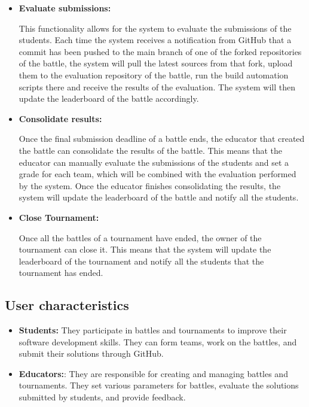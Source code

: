 \documentclass{article}
\begin{document}
\begin{itemize}
    \item \textbf{Evaluate submissions:}
    
    This functionality allows for the system to evaluate the submissions of the students. Each time the system receives
    a notification from GitHub that a commit has been pushed to the main branch of one of the forked repositories of the battle,
    the system will pull the latest sources from that fork, upload them to the evaluation repository of the battle, run the build automation scripts
    there and receive the results of the evaluation. The system will then update the leaderboard of the battle accordingly.

    \item \textbf{Consolidate results:}
    
    Once the final submission deadline of a battle ends, the educator that created the battle can consolidate the 
    results of the battle. This means that the educator can manually evaluate the submissions of the students and 
    set a grade for each team, which will be combined with the evaluation performed by the system. Once the educator
    finishes consolidating the results, the system will update the leaderboard of the battle and notify all the students.

    \item \textbf{Close Tournament:}
    
    Once all the battles of a tournament have ended, the owner of the tournament can close it. This means that the
    system will update the leaderboard of the tournament and notify all the students that the tournament has ended.
\end{itemize}

\subsection{User characteristics}

\begin{itemize}
    \item \textbf{Students:} They participate in battles and tournaments to improve their software development skills. They can form teams, work on the battles, and submit their solutions through GitHub.
    \item \textbf{Educators:}: They are responsible for creating and managing battles and tournaments. They set various parameters for battles, evaluate the solutions submitted by students, and provide feedback.
\end{itemize}
\end{document}
